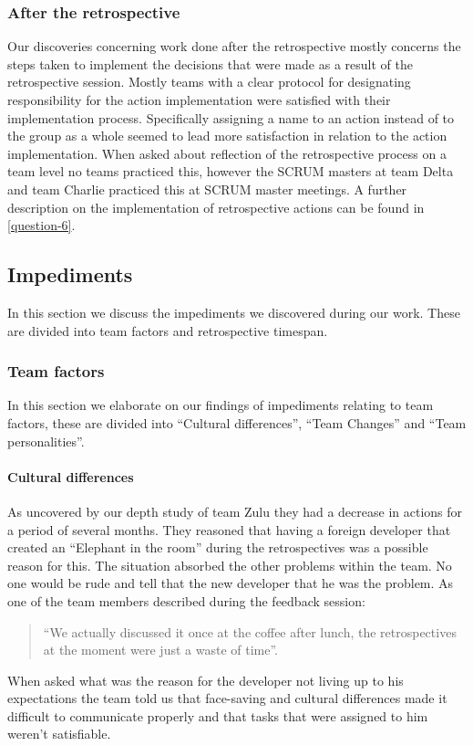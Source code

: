 \subsubsection{After the retrospective}
Our discoveries concerning work done after the retrospective mostly concerns the steps taken to implement the decisions that were made as a result of the retrospective session. Mostly teams with a clear protocol for designating responsibility for the action implementation were satisfied with their implementation process. Specifically assigning a name to an action instead of to the group as a whole seemed to lead more satisfaction in relation to the action implementation. When asked about reflection of the retrospective process on a team level no teams practiced this, however the SCRUM masters at team Delta and team Charlie practiced this at SCRUM master meetings. A further description on the implementation of retrospective actions can be found in \autoref{question-6}.

\subsection{Impediments}
In this section we discuss the impediments we discovered during our work. These are divided into team factors and retrospective timespan.

\subsubsection{Team factors}
In this section we elaborate on our findings of impediments relating to team factors, these are divided into ``Cultural differences'', ``Team Changes'' and ``Team personalities''.

\paragraph{Cultural differences}
\label{results-elephant-in-the-room} 
As uncovered by our depth study of team Zulu they had a decrease in actions for a period of several months. They reasoned that having a foreign developer that created an ``Elephant in the room'' during the retrospectives was a possible reason for this. The situation absorbed the other problems within the team. No one would be rude and tell that the new developer that he was the problem. As one of the team members described during the feedback session: 
\begin{quote}
``We actually discussed it once at the coffee after lunch, the retrospectives at the moment were just a waste of time''. 
\end{quote}
When asked what was the reason for the developer not living up to his expectations the team told us that face-saving and cultural differences made it difficult to communicate properly and that tasks that were assigned to him weren't satisfiable. 

